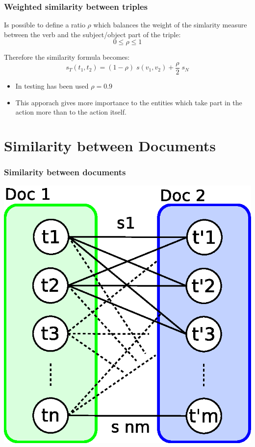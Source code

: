 \documentclass{beamer}
\begin{document}
\begin{frame}
\frametitle{Weighted similarity between triples}
Is possible to define a ratio $\rho$ which balances the weight of the
simlarity measure between the verb and the subject/object part of the
triple:
$$
0 \leq \rho \leq 1
$$

Therefore the similarity formula becomes:
$$
s_{T}(t_{1}, t_{2}) = (1 - \rho) \; s (v_{1}, v_{2}) + \frac{\rho}{2} \; s_{N}
$$
\begin{itemize}
\item In testing has been used $\rho = 0.9$
\item This apporach gives more importance to the entities which take part in
the action more than to the action itself.
\end{itemize}
\end{frame}

\section{Similarity between Documents}
\begin{frame}
\frametitle{Similarity between documents}
\begin{center}
\includegraphics[scale=0.7]{imgs/sim_doc.eps}
\end{center}
\end{frame}
\end{document}
